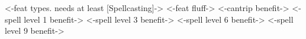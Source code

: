 { <-feat types. needs at least [Spellcasting]-> }
{ <-feat fluff-> }
{ <-cantrip benefit-> }
{ <-spell level 1 benefit-> }
{ <-spell level 3 benefit-> }
{ <-spell level 6 benefit-> }
{ <-spell level 9 benefit-> }